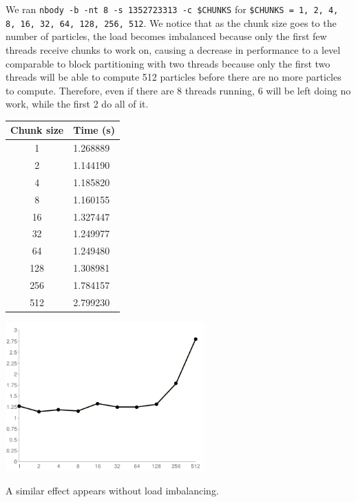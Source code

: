 \documentclass{article}[12pt;letterpaper]
\begin{document}
We ran \texttt{nbody -b -nt 8 -s 1352723313 -c \$CHUNKS} for \texttt{\$CHUNKS =
1, 2, 4, 8, 16, 32, 64, 128, 256, 512}. We notice that as the chunk size goes
to the number of particles, the load becomes imbalanced because only the first
few threads receive chunks to work on, causing a decrease in performance to a
level comparable to block partitioning with two threads because only the first two 
threads will be able to compute 512 particles before there are no more particles to 
compute. Therefore, even if there are 8 threads running, 6 will be left doing no work,
while the first 2 do all of it.

\begin{center}\begin{tabular}{c l}
Chunk size & Time (s) \\
\hline{}
  1 & 1.268889 \\
  2 & 1.144190 \\
  4 & 1.185820 \\
  8 & 1.160155 \\
 16 & 1.327447 \\
 32 & 1.249977 \\
 64 & 1.249480 \\
128 & 1.308981 \\
256 & 1.784157 \\
512 & 2.799230
\end{tabular}

\includegraphics[width=3in]{a2_sec2_1.png}
\end{center}

A similar effect appears without load imbalancing.
\end{document}
